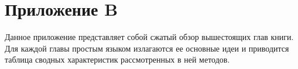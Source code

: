 

\newpage
{}
\pagestyle{empty}
\chapter*{Приложение B}
\vspace{0.5cm}

Данное приложение представляет собой сжатый обзор вышестоящих глав книги. Для каждой главы простым языком излагаются ее основные идеи и приводится таблица сводных характеристик рассмотренных в ней методов.







